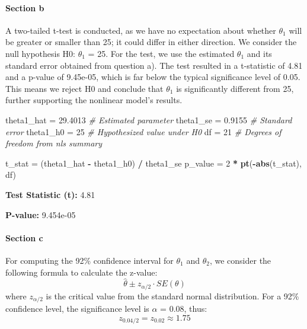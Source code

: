 \documentclass[
  11pt,
]{article}
\newenvironment{Shaded}{\begin{snugshade}}{\end{snugshade}}
\newcommand{\CommentTok}[1]{\textcolor[rgb]{0.56,0.35,0.01}{\textit{#1}}}
\newcommand{\DecValTok}[1]{\textcolor[rgb]{0.00,0.00,0.81}{#1}}
\newcommand{\FloatTok}[1]{\textcolor[rgb]{0.00,0.00,0.81}{#1}}
\newcommand{\FunctionTok}[1]{\textcolor[rgb]{0.13,0.29,0.53}{\textbf{#1}}}
\newcommand{\NormalTok}[1]{#1}
\newcommand{\OtherTok}[1]{\textcolor[rgb]{0.56,0.35,0.01}{#1}}
\newcommand{\SpecialCharTok}[1]{\textcolor[rgb]{0.81,0.36,0.00}{\textbf{#1}}}
\begin{document}
\paragraph{Section b}\label{section-b-2}

A two-tailed t-test is conducted, as we have no expectation about
whether \(\theta_1\) will be greater or smaller than 25; it could differ
in either direction. We consider the null hypothesis H0: \(\theta_1\) =
25. For the test, we use the estimated \(\theta_1\) and its standard
error obtained from question a). The test resulted in a t-statistic of
4.81 and a p-value of 9.45e-05, which is far below the typical
significance level of 0.05. This means we reject H0 and conclude that
\(\theta_1\) is significantly different from 25, further supporting the
nonlinear model's results.

\begin{Shaded}
\begin{Highlighting}[]
\NormalTok{theta1\_hat }\OtherTok{=} \FloatTok{29.4013}  \CommentTok{\# Estimated parameter}
\NormalTok{theta1\_se }\OtherTok{=} \FloatTok{0.9155}    \CommentTok{\# Standard error}
\NormalTok{theta1\_h0 }\OtherTok{=} \DecValTok{25}        \CommentTok{\# Hypothesized value under H0}
\NormalTok{df }\OtherTok{=} \DecValTok{21}               \CommentTok{\# Degrees of freedom from nls summary}

\NormalTok{t\_stat }\OtherTok{=}\NormalTok{ (theta1\_hat }\SpecialCharTok{{-}}\NormalTok{ theta1\_h0) }\SpecialCharTok{/}\NormalTok{ theta1\_se}
\NormalTok{p\_value }\OtherTok{=} \DecValTok{2} \SpecialCharTok{*} \FunctionTok{pt}\NormalTok{(}\SpecialCharTok{{-}}\FunctionTok{abs}\NormalTok{(t\_stat), df)}
\end{Highlighting}
\end{Shaded}

\textbf{Test Statistic (t):} 4.81

\textbf{P-value:} 9.454e-05

\paragraph{Section c}\label{section-c-2}

For computing the 92\% confidence interval for \(\theta_1\) and
\(\theta_2\), we consider the following formula to calculate the
z-value: \[
\hat{\theta} \pm z_{\alpha/2} \cdot SE(\theta)
\] where \(z_{\alpha/2}\) is the critical value from the standard normal
distribution. For a 92\% confidence level, the significance level is
\(\alpha\) = 0.08, thus: \[z_{0.04/2} = z_{0.02} \approx 1.75\]
\end{document}
